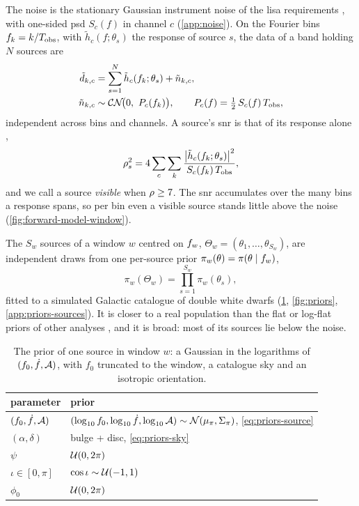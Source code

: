 The noise is the stationary Gaussian instrument noise of the \ac{lisa} requirements
\citep{lisasst2018lisa,babak2021lisa}, with one-sided \ac{psd} $S_c(f)$ in channel $c$
(\cref{app:noise}). On the Fourier bins $f_k = k/T_{\rm obs}$, with $\tilde h_c(f;\theta_s)$ the response of
source $s$, the data of a band holding $N$ sources are
\begin{equation}
\begin{aligned}
  \tilde d_{k,c} &= \sum_{s=1}^{N}\tilde h_c(f_k;\theta_s) + \tilde n_{k,c},\\
  \tilde n_{k,c} &\sim \mathcal{CN}\!\bigl(0,\ P_c(f_k)\bigr),\qquad
  P_c(f) = \tfrac12\,S_c(f)\,T_{\rm obs},
\end{aligned}
  \label{eq:noise-data}
\end{equation}
independent across bins and channels. A source's \ac{snr} is that of its response alone
\citep{cutler1994gravitational},
\begin{equation}
  \rho_s^2 = 4\sum_{c}\sum_{k}\frac{\bigl|\tilde h_c(f_k;\theta_s)\bigr|^2}{S_c(f_k)\,T_{\rm obs}},
  \label{eq:gw-snr}
\end{equation}
and we call a source \emph{visible} when $\rho\ge7$. The \ac{snr} accumulates over the
many bins a response spans, so per bin even a visible source stands little above the noise
(\cref{fig:forward-model-window}).

The $S_w$ sources of a window $w$ centred on $f_{w}$, $\Theta_w = (\theta_1,\dots,\theta_{S_w})$, are
independent draws from one per-source prior $\pi_w(\theta) = \pi(\theta\mid f_{w})$,
\begin{equation}
  \pi_w(\Theta_w) = \prod_{s=1}^{S_w}\pi_w(\theta_s),
  \label{eq:priors-window-prior}
\end{equation}
fitted to a simulated Galactic catalogue of double white dwarfs
\citep{perego2025towards,breivik2020cosmic} (\cref{tab:priors-source}, \cref{fig:priors},
\cref{app:priors-sources}). It is closer to a real population than the flat or log-flat priors of
other analyses \citep{strub2022bayesian,deng2025modular,delmond2026neural}, and it is broad: most of
its sources lie below the noise.

\begin{table}[t]
\caption{The prior of one source in window $w$: a Gaussian in the logarithms of $(f_0,\dot f,\mathcal{A})$,
with $f_0$ truncated to the window, a catalogue sky and an isotropic orientation.}
\label{tab:priors-source}
\centering
\footnotesize
\begin{tabular}{@{}lp{}@{}}
\toprule
parameter & prior \\
\midrule
$(f_0, \dot f, \mathcal{A})$ & $(\log_{10}f_0, \log_{10}\dot f, \log_{10}\mathcal{A})\sim\mathcal{N}(\mu_\pi, \Sigma_\pi)$, \eqref{eq:priors-source} \\
$(\alpha, \delta)$ & bulge + disc, \eqref{eq:priors-sky} \\
$\psi$ & $\mathcal{U}(0, 2\pi)$ \\
$\iota\in[0,\pi]$ & $\cos\iota\sim\mathcal{U}(-1, 1)$ \\
$\phi_0$ & $\mathcal{U}(0, 2\pi)$ \\
\bottomrule
\end{tabular}
\end{table}

